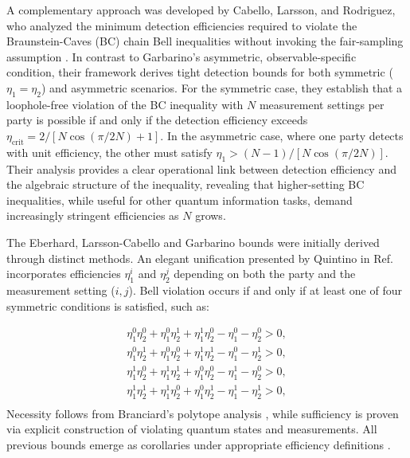 \documentclass[aps,pra,reprint, superscriptaddress,showkeys]{revtex4-2}
\theoremstyle{plain}
\begin{document}
A complementary approach was developed by Cabello, Larsson, and Rodriguez, who analyzed the minimum detection efficiencies required to violate the Braunstein-Caves (BC) chain Bell inequalities without invoking the fair-sampling assumption \cite{Cabello2009}. In contrast to Garbarino's asymmetric, observable-specific condition, their framework derives tight detection bounds for both symmetric (\(\eta_1 = \eta_2\)) and asymmetric scenarios. For the symmetric case, they establish that a loophole-free violation of the BC inequality with \(N\) measurement settings per party is possible if and only if the detection efficiency exceeds \(\eta_{\text{crit}} = 2 / \left[N \cos\left(\pi / 2N\right) + 1\right]\). In the asymmetric case, where one party detects with unit efficiency, the other must satisfy \(\eta_1 > (N-1)/[N \cos(\pi/2N)]\). Their analysis provides a clear operational link between detection efficiency and the algebraic structure of the inequality, revealing that higher-setting BC inequalities, while useful for other quantum information tasks, demand increasingly stringent efficiencies as \(N\) grows.


The Eberhard, Larsson-Cabello and Garbarino bounds were initially derived through distinct methods. An elegant unification presented by Quintino in Ref.~\cite{quintino2012black} incorporates efficiencies $\eta_{1}^i$ and $\eta_{2}^j$ depending on both the party and the measurement setting ($i,j$). Bell violation occurs if and only if at least one of four symmetric conditions is satisfied, such as:

\begin{align}\nonumber
\eta_{1}^0\eta_{2}^0 + \eta_{1}^0\eta_{2}^1 + \eta_{1}^1\eta_{2}^0 - \eta_{1}^0 - \eta_{2}^0 > 0, \\ \nonumber
\eta_{1}^0\eta_{2}^1 + \eta_{1}^0\eta_{2}^0 + \eta_{1}^1\eta_{2}^1 - \eta_{1}^0 - \eta_{2}^1 > 0, \\\nonumber
\eta_{1}^1\eta_{2}^0 + \eta_{1}^1\eta_{2}^1 + \eta_{1}^0\eta_{2}^0 - \eta_{1}^1 - \eta_{2}^0 > 0, \\
\eta_{1}^1\eta_{2}^1 + \eta_{1}^1\eta_{2}^0 + \eta_{1}^0\eta_{2}^1 - \eta_{1}^1 - \eta_{2}^1 > 0, \\\nonumber
\end{align}
Necessity follows from Branciard's polytope analysis \cite{Branciard2011}, while sufficiency is proven via explicit construction of violating quantum states and measurements. All previous bounds emerge as corollaries under appropriate efficiency definitions \cite{quintino2012black}.
\end{document}
